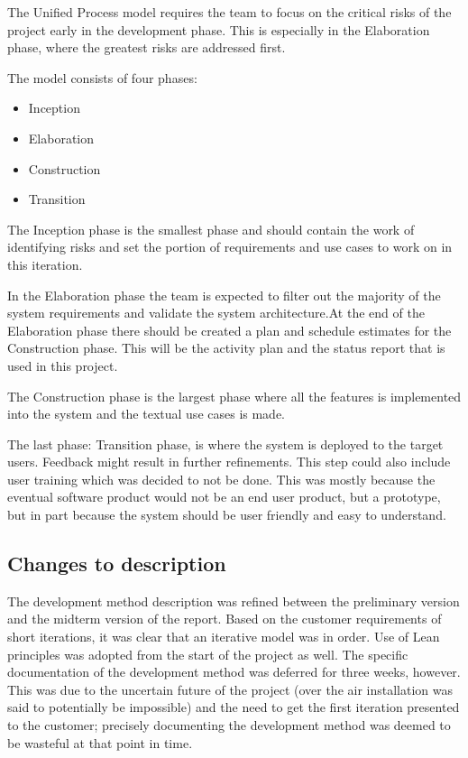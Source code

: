 The Unified Process model requires the team to focus on the critical risks of the project early in the development phase. This is especially in the Elaboration phase, where the greatest risks are addressed first.

The model consists of four phases:

\begin{itemize}
\item{Inception}
\item{Elaboration}
\item{Construction}
\item{Transition}
\end{itemize}

The Inception phase is the smallest phase and should contain the work of identifying risks and set the portion of requirements and use cases to work on in this iteration.

In the Elaboration phase the team is expected to filter out the majority of the system requirements and validate the system architecture.At the end of the Elaboration phase there should be created a plan and schedule estimates for the Construction phase. This will be the activity plan and the status report that is used in this project.

The Construction phase is the largest phase where all the features is implemented into the system and the textual use cases is made.

The last phase: Transition phase, is where the system is deployed to the target users. Feedback might result in further refinements. This step could also include user training which was decided to not be done. This was mostly because the eventual software product would not be an end user product, but a prototype, but in part because the system should be user friendly and easy to understand.

\subsection{Changes to description}
The development method description was refined between the preliminary version and the midterm version of the report. Based on the customer requirements of short iterations, it was clear that an iterative model was in order. Use of Lean principles was adopted from the start of the project as well.
The specific documentation of the development method was deferred for three weeks, however. This was due to the uncertain future of the project (over the air installation was said to potentially be impossible) and the need to get the first iteration presented to the customer; precisely documenting the development method was deemed to be wasteful at that point in time.

